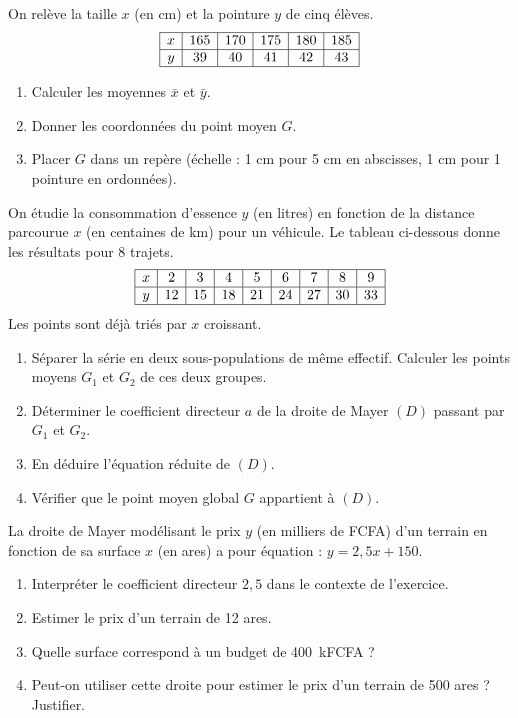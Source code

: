 \documentclass[11pt]{article}
\begin{document}
\begin{exercice}
On relève la taille $x$ (en cm) et la pointure $y$ de cinq élèves.
\[
\begin{array}{|c|c|c|c|c|c|}
\hline
x & 165 & 170 & 175 & 180 & 185 \\
\hline
y & 39 & 40 & 41 & 42 & 43 \\
\hline
\end{array}
\]
\begin{enumerate}
    \item Calculer les moyennes $\bar{x}$ et $\bar{y}$.
    \item Donner les coordonnées du point moyen $G$.
    \item Placer $G$ dans un repère (échelle : 1 cm pour 5 cm en abscisses, 1 cm pour 1 pointure en ordonnées).
\end{enumerate}
\end{exercice}

\begin{exercice}
On étudie la consommation d'essence $y$ (en litres) en fonction de la distance parcourue $x$ (en centaines de km) pour un véhicule. Le tableau ci-dessous donne les résultats pour 8 trajets.
\[
\begin{array}{|c|c|c|c|c|c|c|c|c|}
\hline
x & 2 & 3 & 4 & 5 & 6 & 7 & 8 & 9 \\
\hline
y & 12 & 15 & 18 & 21 & 24 & 27 & 30 & 33 \\
\hline
\end{array}
\]
Les points sont déjà triés par $x$ croissant.
\begin{enumerate}
    \item Séparer la série en deux sous-populations de même effectif. Calculer les points moyens $G_1$ et $G_2$ de ces deux groupes.
    \item Déterminer le coefficient directeur $a$ de la droite de Mayer $(D)$ passant par $G_1$ et $G_2$.
    \item En déduire l'équation réduite de $(D)$.
    \item Vérifier que le point moyen global $G$ appartient à $(D)$.
\end{enumerate}
\end{exercice}

\begin{exercice}
La droite de Mayer modélisant le prix $y$ (en milliers de FCFA) d'un terrain en fonction de sa surface $x$ (en ares) a pour équation : $y = 2,5x + 150$.
\begin{enumerate}
    \item Interpréter le coefficient directeur $2,5$ dans le contexte de l'exercice.
    \item Estimer le prix d'un terrain de 12 ares.
    \item Quelle surface correspond à un budget de \SI{400}{kFCFA} ?
    \item Peut-on utiliser cette droite pour estimer le prix d'un terrain de 500 ares ? Justifier.
\end{enumerate}
\end{exercice}
\end{document}
